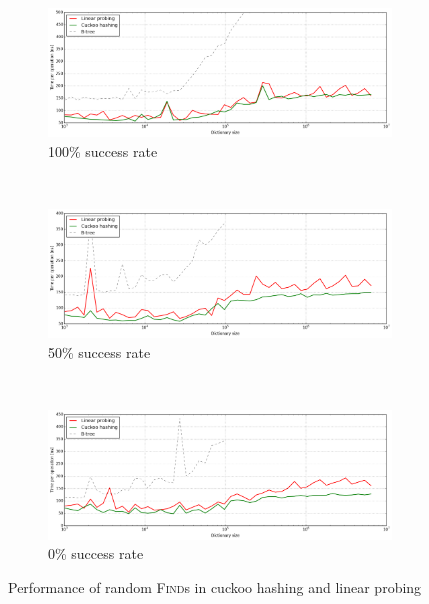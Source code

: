 \begin{figure}
\begin{subfigure}[t]{\textwidth}
	\includegraphics[width=\textwidth]{img/performance/hashing-1-100}
	\caption{100\% success rate}
	\label{fig:sub:hashing-1-100}
\end{subfigure}
\\
\begin{subfigure}[t]{\textwidth}
	\includegraphics[width=\textwidth]{img/performance/hashing-1-50}
	\caption{50\% success rate}
\end{subfigure}
\\
\begin{subfigure}[t]{\textwidth}
	\includegraphics[width=\textwidth]{img/performance/hashing-1-0}
	\caption{0\% success rate}
	\label{fig:sub:hashing-1-0}
\end{subfigure}
\caption{Performance of random \textsc{Find}s in cuckoo hashing and linear probing}
\label{fig:hashing-performance-finds}
\end{figure}

